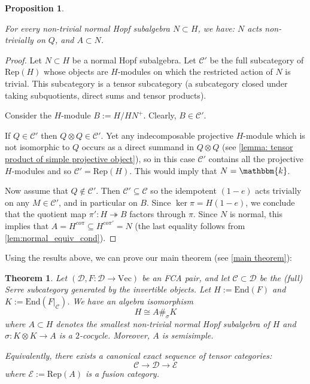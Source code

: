 \documentclass{amsart}
\theoremstyle{plain}%
\newtheorem{theorem}[lemma]{Theorem}
\newtheorem{prop}[lemma]{Proposition}
\theoremstyle{remark}
\newcommand{\C}{\mathcal{C}}
\newcommand{\1}{\mathbbm{1}}
\newcommand{\D}{\mathcal{D}}
\newcommand{\E}{\mathcal{E}}
\newcommand{\End}{\mathrm{End}}
\newcommand{\Rep}{\mathrm{Rep}}
\newcommand{\Vect}{\mathrm{Vec}}
\newcommand{\kk}{\mathbbm{k}}
\begin{document}
    \begin{prop}\label{prop: A is a minimal normal Hopf subalgebra}
        
        For every non-trivial normal Hopf subalgebra $N\subset H$, we have: $N$ acts non-trivially on $Q$, and $A\subset N$.
    
    \end{prop}
    \begin{proof}
     Let $N\subset H$ be a normal Hopf subalgebra.
       Let $\C'$ be the full subcategory of $\Rep(H)$ whose objects are $H$-modules on which the restricted action of $N$ is trivial. This subcategory is a tensor subcategory (a subcategory closed under taking subquotients, direct sums and tensor products).

        Consider the $H$-module $B:=H/HN^+$. Clearly, $B\in \C'$. 
        
        If $Q\in \C'$ then $Q\otimes Q\in \C'$. Yet any indecomposable projective $H$-module which is not isomorphic to $Q$ occurs as a direct summand in $Q\otimes Q$ (see \cref{lemma: tensor product of simple projective object}), so in this case $\C'$ contains all the projective $H$-modules and so $\C'=\Rep(H)$. This would imply that $N = \kk$. 
        
        Now assume that $Q\notin \C'$. Then $\C'\subseteq \C$ so the idempotent $(1-e)$ acts trivially on any $M\in \C'$, and in particular on $B$. Since $\ker \pi = H(1-e)$, we conclude that the quotient map $\pi':H\twoheadrightarrow B$ factors through $\pi$. Since $N$ is normal, this implies that $A=H^{co \pi}\subseteq H^{co \pi'} = N$ (the last equality follows from \cref{lem:normal_equiv_cond}).
    \end{proof}

    Using the results above, we can prove our main theorem (see \ref{main theorem}):
    
    \begin{theorem}\label{thrm:main_theorem_in_full}
        Let $(\D,F:\D\to \Vect)$ be an FCA pair, and let $\C\subset \D$ be the (full) Serre subcategory generated by the invertible objects. Let $H:=\End(F)$ and $K := \End(F|_{\C})$. We have an algebra isomorphism $$H \cong A\#_\sigma K$$ where $A\subset H$ denotes the smallest non-trivial normal Hopf subalgebra of $H$ and $\sigma:K\otimes K\to A$ is a $2$-cocycle. Moreover, $A$ is semisimple.

        Equivalently, there exists a canonical exact sequence of tensor categories:
        $$
            \C\to \D\to \E
        $$
        where
        $\E:=\Rep(A)$ is a fusion category.

    \end{theorem}
\end{document}
